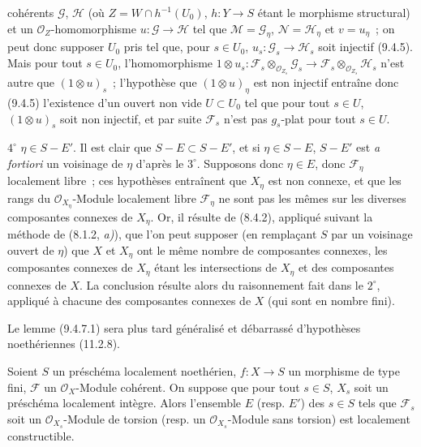 
cohérents $\mathcal G$, $\mathcal H$ (où $Z=W\cap h^{-1}(U_0)$,
$h:Y\to S$ étant le morphisme structural) et un $\mathcal O_Z$-homomorphisme
$u:\mathcal G\to\mathcal H$ tel que $\mathcal M=\mathcal G_\eta$,
$\mathcal N=\mathcal H_\eta$ et $v=u_\eta$~; on peut donc supposer $U_0$ pris
tel que, pour $s\in U_0$, $u_s:\mathcal G_s\to\mathcal H_s$ soit injectif
(9.4.5). Mais pour tout $s\in U_0$, l'homomorphisme
$1\otimes u_s:\mathcal F_s\otimes_{\mathcal O_{Z_s}}\mathcal G_s\to
\mathcal F_s\otimes_{\mathcal O_{Z_s}}\mathcal H_s$ n'est autre que
$(1\otimes u)_s$~; l'hypothèse que $(1\otimes u)_\eta$ est non injectif
entraîne donc (9.4.5) l'existence d'un ouvert non vide $U\subset U_0$ tel que
pour tout $s\in U$, $(1\otimes u)_s$ soit non injectif, et par suite
$\mathcal F_s$ n'est pas $g_s$-plat pour tout $s\in U$.

$4^\circ$ $\eta\in S-E'$. Il est clair que $S-E\subset S-E'$, et si
$\eta\in S-E$, $S-E'$ est \emph{a fortiori} un voisinage de $\eta$ d'après le
$3^\circ$. Supposons donc $\eta\in E$, donc $\mathcal F_\eta$ localement
libre~; ces hypothèses entraînent que $X_\eta$ est non connexe, et que les
rangs du $\mathcal O_{X_\eta}$-Module localement libre $\mathcal F_\eta$ ne
sont pas les mêmes sur les diverses composantes connexes de $X_\eta$. Or, il
résulte de (8.4.2), appliqué suivant la méthode de (8.1.2, \emph{a)}), que l'on
peut supposer (en remplaçant $S$ par un voisinage ouvert de $\eta$) que $X$ et
$X_\eta$ ont le même nombre de composantes connexes, les composantes connexes
de $X_\eta$ étant les intersections de $X_\eta$ et des composantes connexes de
$X$. La conclusion résulte alors du raisonnement fait dans le $2^\circ$,
appliqué à chacune des composantes connexes de $X$ (qui sont en nombre fini).

\begin{remark}[9.4.7.2]
\label{IV.9.4.7.2-fr}
Le lemme (9.4.7.1) sera plus tard généralisé et débarrassé d'hypothèses
noethériennes (11.2.8).
\end{remark}

\begin{proposition}[9.4.8]
\label{IV.9.4.8-fr}
Soient $S$ un préschéma localement noethérien, $f:X\to S$ un morphisme de type
fini, $\mathcal F$ un $\mathcal O_X$-Module cohérent. On suppose que pour tout
$s\in S$, $X_s$ soit un préschéma localement intègre. Alors l'ensemble $E$
\textnormal{(}resp. $E'$\textnormal{)} des $s\in S$ tels que $\mathcal F_s$
soit un $\mathcal O_{X_s}$-Module de torsion \textnormal{(}resp. un
$\mathcal O_{X_s}$-Module sans torsion\textnormal{)} est localement
constructible.
\end{proposition}

